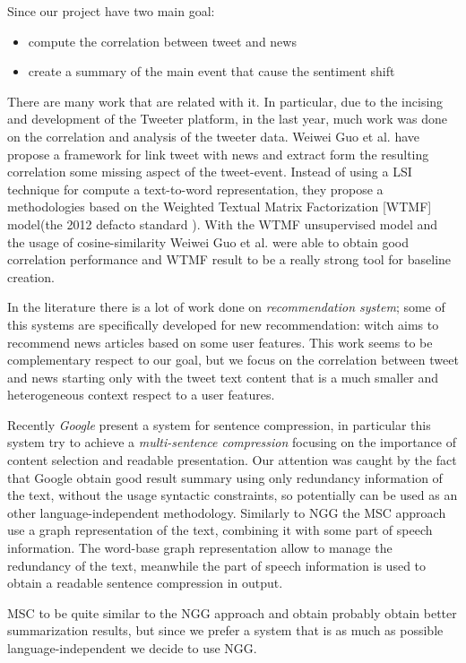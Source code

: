 Since our project have two main goal:
\begin{itemize}
	\item compute the correlation between tweet and news
	\item create a summary of the main event that cause the sentiment shift
\end{itemize}
There are many work that are related with it. 
In particular, due to the incising and development of the Tweeter platform, in the last year, much work was done on the correlation and analysis of the tweeter data. Weiwei Guo et al.\cite{LTN} have propose a framework for link tweet with news and extract form the resulting correlation some missing aspect of the tweet-event. Instead of using a LSI technique for compute a text-to-word representation, they propose a methodologies based on the Weighted Textual Matrix Factorization\cite{WTMF} [WTMF] model(the 2012 defacto standard ). With the WTMF unsupervised model and the usage of cosine-similarity Weiwei Guo et al. were able to obtain good correlation performance and WTMF result to be a really strong tool for baseline creation.

In the literature there is a lot of work done on \emph{recommendation system}; some of this systems are specifically developed for new recommendation: witch aims to recommend news articles based on some user features. This work seems to be complementary respect to our goal, but we focus on the correlation between tweet and news starting only with the tweet text content that is a much smaller and heterogeneous context respect to a user features. 

Recently \emph{Google} present a system for sentence compression, in particular this system try to achieve a \emph{multi-sentence compression}\cite{MSC} focusing on the importance of content selection and readable presentation.
Our attention was caught by the fact that Google obtain good result summary using only redundancy information of the text, without the usage syntactic constraints, so potentially can be used as an other language-independent methodology. Similarly to NGG the MSC approach use a graph representation of the text, combining it with some part of speech information. The word-base graph representation allow to manage the redundancy of the text, meanwhile the part of speech information is used to obtain a readable sentence compression in output. 

MSC to be quite similar to the NGG approach and obtain probably obtain better summarization results, but since we prefer a system that is as much as possible language-independent we decide to use NGG.

